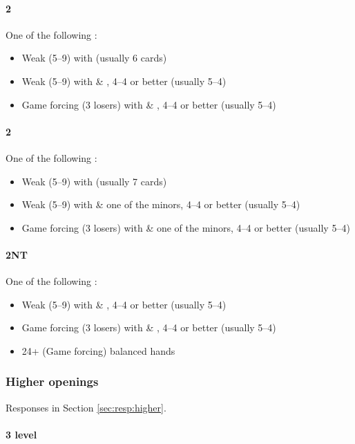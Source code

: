 \paragraph{2\hearts}
One of the following :
\begin{itemize}
\item Weak (5--9) with \spades (usually 6 cards)
\item Weak (5--9) with \clubs \& \diamonds, 4--4 or better (usually 5--4)
\item Game forcing (3 losers) with \clubs \& \diamonds, 4--4 or better (usually 5--4)
\end{itemize}

\paragraph{2\spades}
One of the following :
\begin{itemize}
\item Weak (5--9) with \clubs (usually 7 cards)
\item Weak (5--9) with \hearts \& one of the minors, 4--4 or better (usually 5--4)
\item Game forcing (3 losers) with \hearts \& one of the minors, 4--4 or better (usually 5--4)
\end{itemize}

\paragraph{2NT}
One of the following :
\begin{itemize}
\item Weak (5--9) with \spades \& \diamonds, 4--4 or better (usually 5--4)
\item Game forcing (3 losers) with \spades \& \diamonds, 4--4 or better (usually 5--4)
\item 24+ (Game forcing) balanced hands
\end{itemize}

\subsubsection{Higher openings}
\label{sec:open:higher}

Responses in Section \ref{sec:resp:higher}.

\paragraph{3 level}

